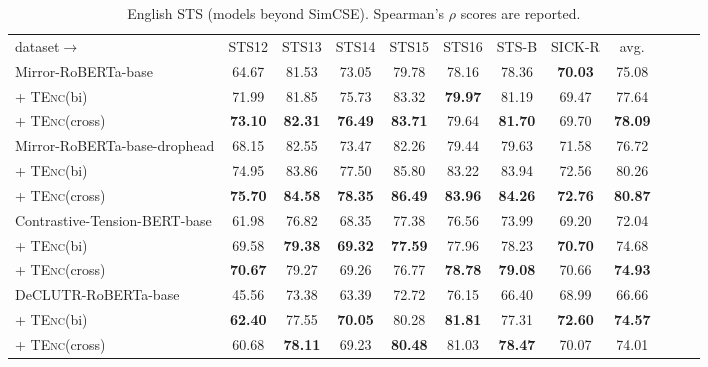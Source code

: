 \documentclass{article} \usepackage{iclr2021_conference,times}
\newcommand{\tenc}{\textsc{TEnc}\xspace}
\begin{document}
\begin{table}[!t] \setlength{\tabcolsep}{4.0pt}
\centering
\small
\begin{tabular}{lccccccccccc}
\cmidrule[1.5pt]{1-10}
dataset$\rightarrow$  & STS12 & STS13 & STS14 & STS15 & STS16 & STS-B & SICK-R & avg.\\
\cmidrule[1.5pt]{1-10}
Mirror-RoBERTa-base & 64.67 & 81.53 & 73.05 & 79.78 & 78.16 & 78.36 & \textbf{70.03} & 75.08 \\
 + \tenc (bi) & 71.99 & 81.85 & 75.73 & 83.32 & \textbf{79.97} & 81.19 & 69.47 & 77.64 \\
 + \tenc (cross) & \textbf{73.10} & \textbf{82.31} & \textbf{76.49} & \textbf{83.71} & 79.64 & \textbf{81.70} & 69.70 & \textbf{78.09} \\
\cmidrule[1.0pt]{1-10}
 Mirror-RoBERTa-base-drophead &  68.15 & 82.55 & 73.47 & 82.26 & 79.44 & 79.63 & 71.58 & 76.72\\
 + \tenc (bi) & 74.95 & 83.86 & 77.50 & 85.80 & 83.22 & 83.94 & 72.56 & 80.26  \\
 + \tenc (cross) & \textbf{75.70} & \textbf{84.58} & \textbf{78.35} & \textbf{86.49} & \textbf{83.96} & \textbf{84.26} & \textbf{72.76} & \textbf{80.87} \\
 \cmidrule[1.0pt]{1-10}
Contrastive-Tension-BERT-base & 61.98 & 76.82 & 68.35 & 77.38 & 76.56 & 73.99 & 69.20 & 72.04 \\
+ \tenc (bi) & 69.58 & \textbf{79.38} & \textbf{69.32} & \textbf{77.59} & 77.96 & 78.23 & \textbf{70.70} & 74.68 \\
+ \tenc (cross) & \textbf{70.67} & 79.27 & 69.26 & 76.77 & \textbf{78.78} & \textbf{79.08} & 70.66 & \textbf{74.93} \\
\cmidrule[1.0pt]{1-10}
DeCLUTR-RoBERTa-base & 45.56 & 73.38 & 63.39 & 72.72 & 76.15 & 66.40 & 68.99 & 66.66 \\
+ \tenc (bi) & \textbf{62.40} & 77.55 & \textbf{70.05} & 80.28 & \textbf{81.81} & 77.31 & \textbf{72.60} & \textbf{74.57} \\
+ \tenc (cross) & 60.68 & \textbf{78.11} & 69.23 & \textbf{80.48} & 81.03 & \textbf{78.47} & 70.07 & 74.01 \\
\cmidrule[1.5pt]{1-10}
\end{tabular}
\caption{English STS (models beyond SimCSE).  Spearman's $\rho$ scores are reported.}
\label{tab:sts_mirrorbert}
\end{table}
\end{document}
